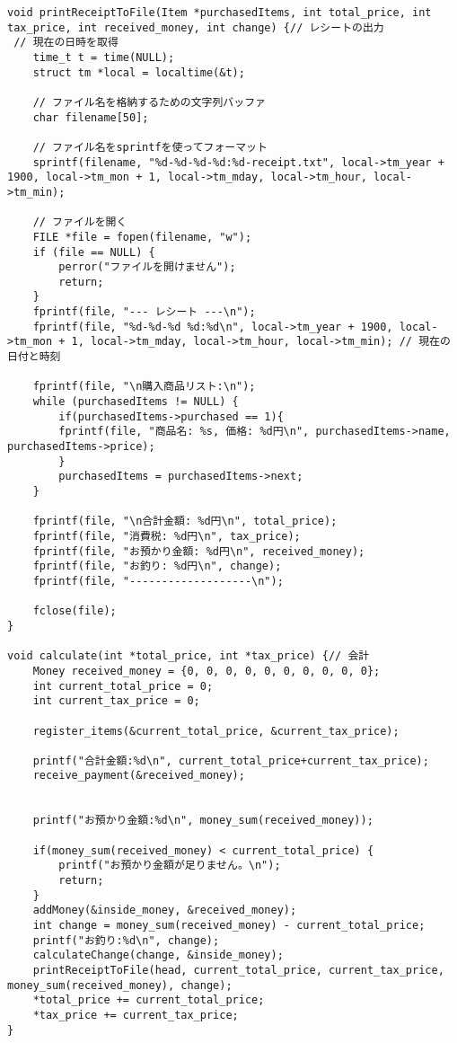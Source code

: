 \documentclass[a4j,11pt]{jarticle}
\begin{document}
\begin{lstlisting}
void printReceiptToFile(Item *purchasedItems, int total_price, int tax_price, int received_money, int change) {// レシートの出力
 // 現在の日時を取得
    time_t t = time(NULL);
    struct tm *local = localtime(&t);

    // ファイル名を格納するための文字列バッファ
    char filename[50];

    // ファイル名をsprintfを使ってフォーマット
    sprintf(filename, "%d-%d-%d-%d:%d-receipt.txt", local->tm_year + 1900, local->tm_mon + 1, local->tm_mday, local->tm_hour, local->tm_min);

    // ファイルを開く
    FILE *file = fopen(filename, "w");
    if (file == NULL) {
        perror("ファイルを開けません");
        return;
    }
    fprintf(file, "--- レシート ---\n");
    fprintf(file, "%d-%d-%d %d:%d\n", local->tm_year + 1900, local->tm_mon + 1, local->tm_mday, local->tm_hour, local->tm_min); // 現在の日付と時刻

    fprintf(file, "\n購入商品リスト:\n");
    while (purchasedItems != NULL) {
        if(purchasedItems->purchased == 1){
        fprintf(file, "商品名: %s, 価格: %d円\n", purchasedItems->name, purchasedItems->price);
        }
        purchasedItems = purchasedItems->next;
    }

    fprintf(file, "\n合計金額: %d円\n", total_price);
    fprintf(file, "消費税: %d円\n", tax_price);
    fprintf(file, "お預かり金額: %d円\n", received_money);
    fprintf(file, "お釣り: %d円\n", change);
    fprintf(file, "-------------------\n");

    fclose(file);
}

void calculate(int *total_price, int *tax_price) {// 会計
    Money received_money = {0, 0, 0, 0, 0, 0, 0, 0, 0, 0};
    int current_total_price = 0;
    int current_tax_price = 0;

    register_items(&current_total_price, &current_tax_price);

    printf("合計金額:%d\n", current_total_price+current_tax_price);
    receive_payment(&received_money);

    
    printf("お預かり金額:%d\n", money_sum(received_money));
    
    if(money_sum(received_money) < current_total_price) {
        printf("お預かり金額が足りません。\n");
        return;
    }
    addMoney(&inside_money, &received_money);
    int change = money_sum(received_money) - current_total_price;
    printf("お釣り:%d\n", change);
    calculateChange(change, &inside_money);
    printReceiptToFile(head, current_total_price, current_tax_price, money_sum(received_money), change);
    *total_price += current_total_price;
    *tax_price += current_tax_price;
}


\end{lstlisting}
\end{document}
